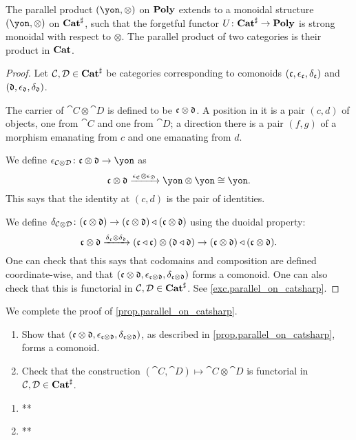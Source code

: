 \documentclass[Book-Poly]{subfiles}
\begin{document}
\begin{proposition}\label{prop.parallel_on_catsharp}
The parallel product $(\yon,\otimes)$ on $\mathbf{Poly}$ extends to a monoidal structure $(\yon,\otimes)$ on $\mathbf{Cat}^\sharp$, such that the forgetful functor
$U\colon\mathbf{Cat}^\sharp\to\mathbf{Poly}$
is strong monoidal with respect to $\otimes$.
The parallel product of two categories is their product in $\mathbf{Cat}$.
\end{proposition}
\begin{proof}
Let $\mathcal{C},\mathcal{D}\in\mathbf{Cat}^\sharp$ be categories corresponding to comonoids $(\mathfrak{c},\epsilon_{\mathfrak{c}},\delta_{\mathfrak{c}})$ and $(\mathfrak{d},\epsilon_{\mathfrak{d}},\delta_{\mathfrak{d}})$.



The carrier of $\cat{C}\otimes\cat{D}$ is defined to be $\mathfrak{c}\otimes\mathfrak{d}$. A position in it is a pair $(c,d)$ of objects, one from $\cat{C}$ and one from $\cat{D}$; a direction there is a pair $(f,g)$ of a morphism emanating from $c$ and one emanating from $d$. 

We define $\epsilon_{\cat{C}\otimes\cat{D}}\colon\car{c}\otimes\car{d}\to\yon$ as
\[
\car{c}\otimes\car{d}\To{\epsilon_{\car{C}}\otimes\epsilon_{\car{D}}}\yon\otimes\yon\cong\yon.
\]
This says that the identity at $(c,d)$ is the pair of identities.

We define $\delta_{\mathcal{C}\otimes\mathcal{D}}\colon(\mathfrak{c}\otimes\mathfrak{d})\to(\mathfrak{c}\otimes\mathfrak{d})\mathbin{\triangleleft}(\mathfrak{c}\otimes\mathfrak{d})$ using the duoidal property:
\[
\mathfrak{c}\otimes\mathfrak{d}\xrightarrow{\delta_{\mathfrak{c}}\otimes\delta_{\mathfrak{d}}}(\mathfrak{c}\mathbin{\triangleleft}\mathfrak{c})\otimes(\mathfrak{d}\mathbin{\triangleleft}\mathfrak{d})\to(\mathfrak{c}\otimes\mathfrak{d})\mathbin{\triangleleft}(\mathfrak{c}\otimes\mathfrak{d}).
\]
One can check that this says that codomains and composition are defined coordinate-wise, and that $(\mathfrak{c}\otimes\mathfrak{d},\epsilon_{\mathfrak{c}\otimes\mathfrak{d}},\delta_{\mathfrak{c}\otimes\mathfrak{d}})$ forms a comonoid. One can also check that this is functorial in $\mathcal{C},\mathcal{D}\in\mathbf{Cat}^\sharp$. See \cref{exc.parallel_on_catsharp}.
\end{proof}

\begin{exercise}\label{exc.parallel_on_catsharp}
We complete the proof of \cref{prop.parallel_on_catsharp}.
\begin{enumerate}
	\item Show that $(\mathfrak{c}\otimes\mathfrak{d},\epsilon_{\mathfrak{c}\otimes\mathfrak{d}},\delta_{\mathfrak{c}\otimes\mathfrak{d}})$, as described in \cref{prop.parallel_on_catsharp}, forms a comonoid.
	\item Check that the construction $(\cat{C},\cat{D})\mapsto\cat{C}\otimes\cat{D}$ is functorial in $\mathcal{C},\mathcal{D}\in\mathbf{Cat}^\sharp$.
\qedhere
\end{enumerate}
\begin{solution}
\begin{enumerate}
    \item **
    \item **
\end{enumerate}
\end{solution}
\end{exercise}
\end{document}
